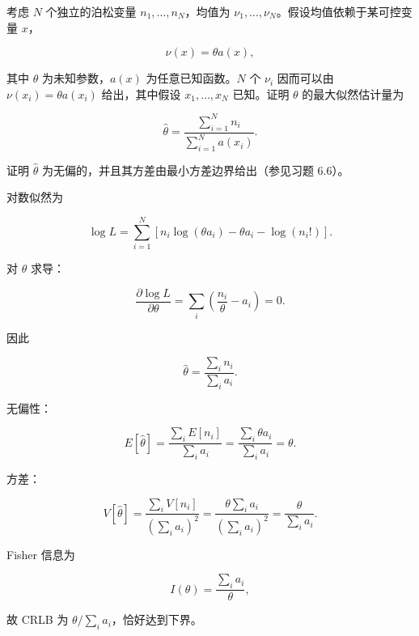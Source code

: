 \begin{question}
考虑 \(N\) 个独立的泊松变量 \(n_1,\ldots,n_N\)，均值为
\(\nu_1,\ldots,\nu_N\)。假设均值依赖于某可控变量 \(x\)，

\[
\nu(x)=\theta a(x),
\]

其中 \(\theta\) 为未知参数，\(a(x)\) 为任意已知函数。\(N\) 个 \(\nu_i\)
因而可以由 \(\nu(x_i)=\theta a(x_i)\) 给出，其中假设 \(x_1,\ldots,x_N\)
已知。证明 \(\theta\) 的最大似然估计量为

\[
\hat\theta=\frac{\sum_{i=1}^{N}n_i}{\sum_{i=1}^{N}a(x_i)}.
\]

证明 \(\hat\theta\) 为无偏的，并且其方差由最小方差边界给出（参见习题
6.6）。
\begin{solution}
对数似然为

\[
\log L=\sum_{i=1}^N\left[n_i\log(\theta a_i)-\theta a_i-\log(n_i!)\right].
\]

对 \(\theta\) 求导：

\[
\frac{\partial\log L}{\partial\theta}=
\sum_i\left(\frac{n_i}{\theta}-a_i\right)=0.
\]

因此

\[
\hat\theta=\frac{\sum_i n_i}{\sum_i a_i}.
\]

无偏性：

\[
E[\hat\theta]=\frac{\sum_i E[n_i]}{\sum_i a_i}
=\frac{\sum_i \theta a_i}{\sum_i a_i}=\theta.
\]

方差：

\[
V[\hat\theta]=\frac{\sum_i V[n_i]}{(\sum_i a_i)^2}
=\frac{\theta\sum_i a_i}{(\sum_i a_i)^2}
=\frac{\theta}{\sum_i a_i}.
\]

Fisher 信息为

\[
I(\theta)=\frac{\sum_i a_i}{\theta},
\]

故 CRLB 为 \(\theta/\sum_i a_i\)，恰好达到下界。
\end{solution}
\end{question}



